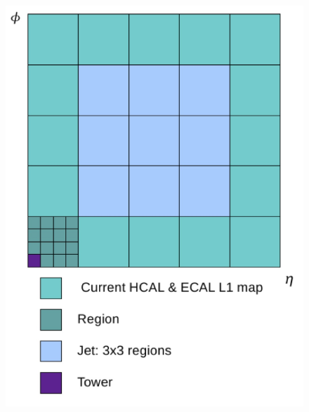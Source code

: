 \begin{figure}[ht]
\begin{center}
  \includegraphics[scale=0.34]{Figures/l1jets/CurrentL1Jet.jpg}

\end{center}
\end{figure}
